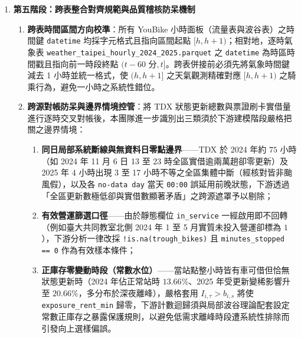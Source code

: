 \begin{enumerate}
    \item \textbf{第五階段：跨表整合對齊規範與品質稽核防呆機制}
    \begin{enumerate}[label = \textbullet]
        \item \textbf{跨表時間區間方向校準}：所有 YouBike 小時面板（流量表與波谷表）之時間鍵 \texttt{datetime} 均採字元格式且指向區間起點 $[h, h+1)$；相對地，逐時氣象表 \texttt{weather\_taipei\_\allowbreak hourly\_2024\_2025.parquet} 之 \texttt{datetime} 為時區時間戳且指向前一時段終點 $(t - 60\text{ 分}, t]$。跨表併接前必須先將氣象時間鍵減去 1 小時並統一格式，使 $(h, h+1]$ 之天氣觀測精確對應 $[h, h+1)$ 之騎乘行為，避免一小時之系統性錯位。
        \item \textbf{跨源對帳防呆與邊界情境控管}：將 TDX 狀態更新總數與票證刷卡實借量進行逐時交叉對帳後，本團隊進一步識別出三類須於下游建模階段嚴格把關之邊界情境：
        \begin{enumerate}
          \item \textbf{同日局部系統斷線與無資料日零點邊界}——TDX 於 2024 年約 $75$ 小時（如 2024 年 11 月 6 日 13 至 23 時全區實借逾兩萬趟卻零更新）及 2025 年 $4$ 小時出現 3 至 17 小時不等之全區集體中斷（經核對皆非颱風假），以及各 \texttt{no-data day} 當天 \texttt{00:00} 誤延用前晚狀態，下游透過「全區更新數極低卻與實借數顯著矛盾」之跨源遮罩予以剔除；
          \item \textbf{有效營運篩選口徑}——由於靜態欄位 \texttt{in\_service} 一經啟用即不回轉（例如臺大共同教室北側 2024 年 1 至 5 月實質未投入營運卻標為 $1$），下游分析一律改採 \texttt{!is.na(trough\_bikes)} 且 \texttt{minutes\_stopped == 0} 作為有效樣本條件；
          \item \textbf{正庫存零變動時段（常數水位）}——當站點整小時皆有車可借但恰無狀態更新時（2024 年佔正常站時 $13.66\%$、2025 年受更新變稀影響升至 $20.66\%$，多分布於深夜離峰），嚴格套用 $I_{i,\tau} > b_{i,s}$ 將使 \texttt{exposure\_rent\_min} 歸零，下游計數迴歸須與局部波谷理論配套設定常數正庫存之暴露保護規則，以避免低需求離峰時段遭系統性排除而引發向上選樣偏誤。
        \end{enumerate}
    \end{enumerate}
\end{enumerate}

